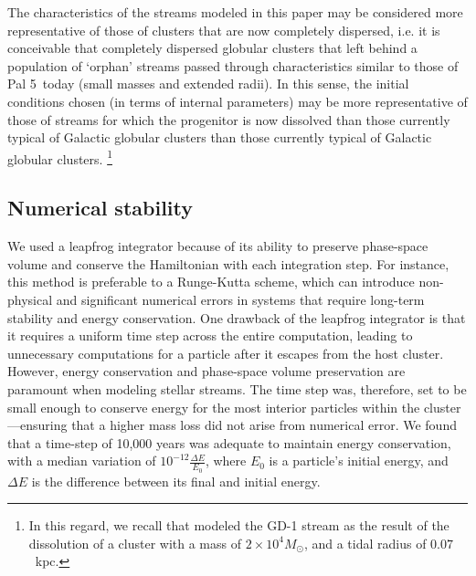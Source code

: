 \documentclass{aa}
\begin{document}
The characteristics of the streams modeled in this paper may be considered more representative of those of clusters that are now completely dispersed, i.e. it is conceivable that completely dispersed globular clusters that left behind a population of `orphan' streams passed through characteristics similar to those of Pal 5~today (small masses and extended radii). In this sense, the initial conditions chosen (in terms of internal parameters) may be more representative of those of streams for which the progenitor is now dissolved \citep[see, for example, the population of streams without progenitors described by][]{2024ApJ...967...89I} than those currently typical of Galactic globular clusters than those currently typical of Galactic globular clusters. \footnote{In this regard, we recall that \citet{2014ApJ...795...95B} modeled the GD-1 stream as the result of the dissolution of a cluster with a mass of $2 \times 10^4 M_\odot$, and a tidal radius of $0.07$~kpc.}




  \subsection{Numerical stability}\label{num_quality}

    We used a leapfrog integrator because of its ability to preserve phase-space volume and conserve the Hamiltonian with each integration step. For instance, this method is preferable to a Runge-Kutta scheme, which can introduce non-physical and significant numerical errors in systems that require long-term stability and energy conservation. One drawback of the leapfrog integrator is that it requires a uniform time step across the entire computation, leading to unnecessary computations for a particle after it escapes from the host cluster. However, energy conservation and phase-space volume preservation are paramount when modeling stellar streams. The time step was, therefore, set to be small enough to conserve energy for the most interior particles within the cluster---ensuring that a higher mass loss did not arise from numerical error. We found that a time-step of 10,000 years was adequate to maintain energy conservation, with a median variation of $10^{-12} \frac{\Delta E}{E_0}$, where $E_0$ is a particle's initial energy, and $\Delta E$ is the difference between its final and initial energy. 
    
\end{document}
